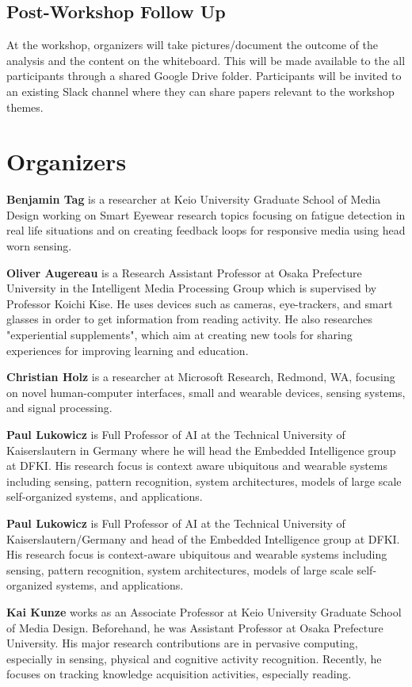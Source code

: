 \documentclass{sigchi-ext}
\begin{document}
\subsection{Post-Workshop Follow Up}
At the workshop, organizers will take pictures/document the outcome of the analysis and the content on the whiteboard. This will be made available to the all participants through a shared Google Drive folder. Participants will be invited to an existing Slack channel where they can share papers relevant to the workshop themes.

\section{Organizers}

{\bf Benjamin Tag} is a researcher at Keio University Graduate School of Media Design working on Smart Eyewear research topics focusing on fatigue detection in real life situations and on creating feedback loops for responsive media using head worn sensing.

{\bf Oliver Augereau} is a Research Assistant Professor at Osaka Prefecture University in the Intelligent Media Processing Group which is supervised by Professor Koichi Kise. He uses devices such as cameras, eye-trackers, and smart glasses in order to get information from reading activity. He also researches "experiential supplements", which aim at creating new tools for sharing experiences for improving learning and education.

{\bf Christian Holz} is a researcher at Microsoft Research, Redmond, WA, focusing on novel human-computer interfaces, small and wearable devices, sensing systems, and signal processing.

{\bf Paul Lukowicz} is Full Professor of AI at the Technical University of Kaiserslautern in Germany where he will head the Embedded Intelligence group at DFKI. His research focus is context aware ubiquitous and wearable systems including sensing, pattern recognition, system architectures, models of large scale self-organized systems, and applications.

{\bf Paul Lukowicz} is Full Professor of AI at the Technical University of Kaiserslautern/Germany and head of the Embedded Intelligence group at DFKI. His research focus is context-aware ubiquitous and wearable systems including sensing, pattern recognition, system architectures, models of large scale self-organized systems, and applications.

{\bf Kai Kunze} works as an Associate Professor at Keio University Graduate School of Media Design. Beforehand, he was Assistant Professor at Osaka Prefecture University. His major research contributions are in pervasive computing, especially in sensing, physical and cognitive activity recognition. Recently, he focuses on tracking knowledge acquisition activities, especially reading.
\end{document}
